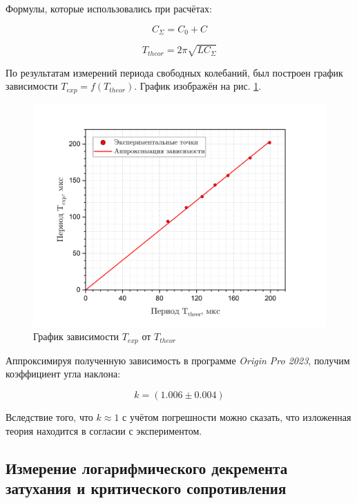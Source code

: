 \documentclass[a4paper, 12pt]{article}
\begin{document}
    Формулы, которые использовались при расчётах:

    \begin{equation}
        C_\Sigma = C_0 + C
    \end{equation}

    \begin{equation}
        T_{theor} = 2 \pi \sqrt{LC_\Sigma}
    \end{equation}


    По результатам измерений периода свободных колебаний, был построен график зависимости $T_{exp} = f (T_{theor})$. График изображён на рис. \ref{graph:exp(theor)}.

    \begin{figure}[H]
        \centering
        \includegraphics[scale = 0.6]{images/graph_exp(theor).png}
        \caption{График зависимости $T_{exp}$ от $T_{theor}$}
        \label{graph:exp(theor)}
    \end{figure}

    Аппроксимируя полученную зависимость в программе \textit{Origin Pro 2023}, получим коэффициент угла наклона:

    $$
    \boxed{k = \left( 1.006 \pm 0.004 \right)}
    $$

    Вследствие того, что $k \approx 1$ с учётом погрешности можно сказать, что изложенная теория находится в согласии с экспериментом.

    \subsection{Измерение логарифмического декремента затухания и критического сопротивления}
\end{document}
